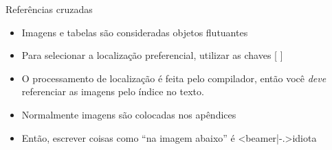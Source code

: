     \begin{frame}{Referências cruzadas}
        \begin{itemize}[<+->]
            \item Imagens e tabelas são consideradas objetos flutuantes
            \item Para selecionar a localização preferencial, utilizar as chaves [ ]
            \item O processamento de localização é feita pelo compilador, então você \textit{deve} referenciar as imagens pelo índice no texto.
            \item Normalmente imagens são colocadas nos apêndices
            \item Então, escrever coisas como ``na imagem abaixo'' é \only<beamer|-.>{idiota}
        \end{itemize}
    \end{frame}

